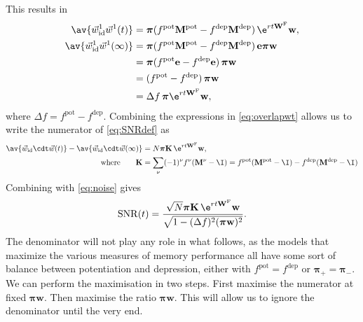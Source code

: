 \documentclass[12pt]{article}
\newcommand{\onev}{\mathbf{e}}
\newcommand{\eqm}{\pi}
\newcommand{\eq}{\boldsymbol{\eqm}}
\newcommand{\wm}{w}
\newcommand{\w}{\mathbf{\wm}}
\newcommand{\Wm}{W}
\newcommand{\W}{\mathbf{\Wm}}
\newcommand{\MMdm}{M}
\newcommand{\MMd}{\mathbf{\MMdm}}
\newcommand{\encm}{K}
\newcommand{\enc}{\mathbf{\encm}}
\newcommand{\frg}{\W^{\mathrm{F}}}
\newcommand{\pot}{^{\text{pot}}}
\newcommand{\dep}{^{\text{dep}}}
\newcommand{\syn}{\vec{w}}
\newcommand{\synid}{\syn_\text{id}}
\DeclareMathOperator{\SNR}{SNR}
\begin{document}
This results in
%
\begin{equation}\label{eq:overlapwt}
\begin{aligned}
  \av{\synid^1 \syn^1(t)} &= \eq (f\pot \MMd \pot-f\dep \MMd \dep)\, \e^{rt\frg} \w, \\
  \av{\synid^1 \syn^1(\infty)} &= \eq (f\pot \MMd \pot-f\dep \MMd \dep)\, \onev\eq \w \\
         &= \eq (f\pot\onev-f\dep\onev)\, \eq \w \\
         &=  (f\pot-f\dep)\, \eq \w \\
         &=  \Delta f\, \eq \e^{rt\frg} \w ,
\end{aligned}
\end{equation}
%
where \(\Delta f = f\pot - f\dep \).
Combining the expressions in \cref{eq:overlapwt} allows us to write the numerator of \cref{eq:SNRdef} as
%
\begin{equation}\label{eq:signal}
\begin{aligned}
  \av{\synid \cdt \syn(t)} - \av{\synid \cdt \syn(\infty)}
    &= N \eq \enc \, \e^{rt \frg} \w , \\
    \text{where} \qquad
  \enc &= \sum_\nu (-1)^\nu f^\nu (\MMd^\nu - \I)
    = f\pot(\MMd \pot-\I)-f\dep(\MMd \dep-\I)
\end{aligned}
\end{equation}
%
Combining with \eqref{eq:noise} gives
%
\begin{equation}\label{eq:SNRcurveExact}
  \SNR(t) = \frac{\sqrt{N} \eq \enc\,\e^{rt \frg}\w}
                 {\sqrt{1-(\Delta f)^2(\eq \w)^2}}.
\end{equation}
%
The denominator will not play any role in what follows, as the models that maximize the various measures of memory performance all have some sort of balance between potentiation and depression, either with \(f\pot=f\dep\) or \(\eq_+=\eq_-\).
We can perform the maximisation in two steps.
First maximise the numerator at fixed \(\eq \w\).
Then maximise the ratio \wrt \(\eq\w\).
This will allow us to ignore the denominator until the very end.
\end{document}
